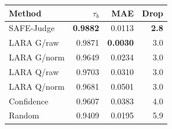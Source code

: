 \begin{tabular}{@{}lrrr@{}}
\toprule
Method & $\tau_b$ & MAE & Drop \\
\midrule
SAFE-Judge & \textbf{0.9882} & 0.0113 & \textbf{2.8} \\
LARA G/raw & 0.9871 & \textbf{0.0030} & 3.0 \\
LARA G/norm & 0.9649 & 0.0234 & 3.0 \\
LARA Q/raw & 0.9703 & 0.0310 & 3.0 \\
LARA Q/norm & 0.9681 & 0.0501 & 3.0 \\
Confidence & 0.9607 & 0.0383 & 4.0 \\
Random & 0.9409 & 0.0195 & 5.9 \\
\bottomrule
\end{tabular}

